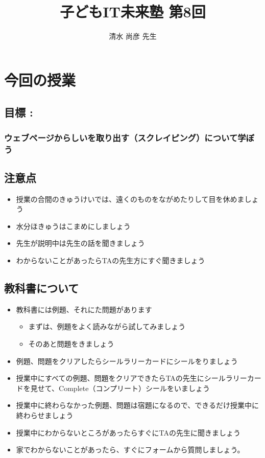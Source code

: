 \documentclass[a4paper,12pt,dvipdfmx]{jarticle}
\title{\Huge\bf\vspace{70mm} 子どもIT未来塾 第8回}
\author{
清水 尚彦 先生}
\date{}
\begin{document}
\clearpage\setcounter{page}{1}\pagestyle{Standard}
\maketitle
\thispagestyle{FirstPage}

\bigskip

\clearpage\section{今回の授業}
\subsection*{目標 : }
\subsubsection*{ウェブページからしいを取り出す（スクレイピング）について学ぼう}
\subsection*{注意点}
\begin{itemize}
\item
授業の合間のきゅうけいでは、遠くのものをながめたりして目を休めましょう
\item 水分ほきゅうはこまめにしましょう
\item
先生が説明中は先生の話を聞きましょう
\item
わからないことがあったらTAの先生方にすぐ聞きましょう
\end{itemize}
\subsection*{教科書について}
\begin{itemize}
\item
教科書には例題、それにた問題があります

\begin{itemize}
\item
まずは、例題をよく読みながら試してみましょう
\item そのあと問題をきましょう
\end{itemize}
\item
例題、問題をクリアしたらシールラリーカードにシールをりましょう
\item
授業中にすべての例題、問題をクリアできたらTAの先生にシールラリーカードを見せて、Complete（コンプリート）シールをいましょう
\item
授業中に終わらなかった例題、問題は宿題になるので、できるだけ授業中に終わらせましょう
\item
授業中にわからないところがあったらすぐにTAの先生に聞きましょう
\item
家でわからないことがあったら、すぐにフォームから質問しましょう。
\end{itemize}
\end{document}

